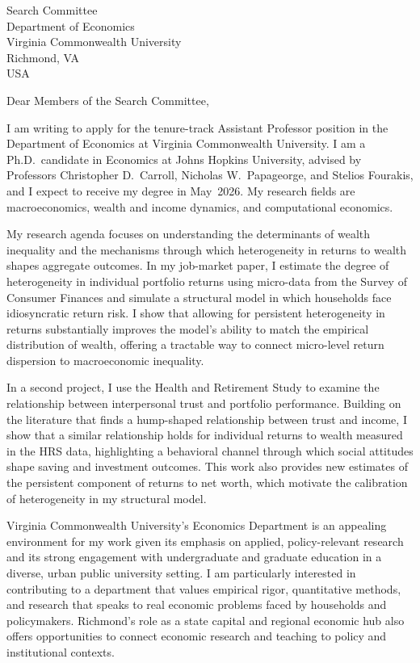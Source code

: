 \documentclass[11pt,letterpaper]{letter}
\begin{document}
\begin{letter}{Search Committee \\
Department of Economics \\
Virginia Commonwealth University \\
Richmond, VA \\ USA}

\opening{Dear Members of the Search Committee,}

I am writing to apply for the tenure-track Assistant Professor position in the Department of Economics at Virginia Commonwealth University. I am a Ph.D.\ candidate in Economics at Johns Hopkins University, advised by Professors Christopher D.~Carroll, Nicholas W.~Papageorge, and Stelios Fourakis, and I expect to receive my degree in May~2026. My research fields are macroeconomics, wealth and income dynamics, and computational economics.

My research agenda focuses on understanding the determinants of wealth inequality and the mechanisms through which heterogeneity in returns to wealth shapes aggregate outcomes. In my job-market paper, I estimate the degree of heterogeneity in individual portfolio returns using micro-data from the Survey of Consumer Finances and simulate a structural model in which households face idiosyncratic return risk. I show that allowing for persistent heterogeneity in returns substantially improves the model’s ability to match the empirical distribution of wealth, offering a tractable way to connect micro-level return dispersion to macroeconomic inequality.

In a second project, I use the Health and Retirement Study to examine the relationship between interpersonal trust and portfolio performance. Building on the literature that finds a hump-shaped relationship between trust and income, I show that a similar relationship holds for individual returns to wealth measured in the HRS data, highlighting a behavioral channel through which social attitudes shape saving and investment outcomes. This work also provides new estimates of the persistent component of returns to net worth, which motivate the calibration of heterogeneity in my structural model.

Virginia Commonwealth University’s Economics Department is an appealing environment for my work given its emphasis on applied, policy-relevant research and its strong engagement with undergraduate and graduate education in a diverse, urban public university setting. I am particularly interested in contributing to a department that values empirical rigor, quantitative methods, and research that speaks to real economic problems faced by households and policymakers. Richmond’s role as a state capital and regional economic hub also offers opportunities to connect economic research and teaching to policy and institutional contexts.


\end{letter}
\end{document}
